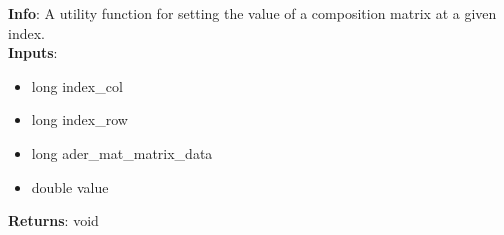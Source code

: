 \textbf{Info}: A utility function for setting the value of a composition matrix
at a given index.\\

\noindent \textbf{Inputs}:
\begin{itemize}
\item{long index\_col}
\item{long index\_row}
\item{long ader\_mat\_matrix\_data}
\item{double value}
\end{itemize}

\noindent \textbf{Returns}: void
